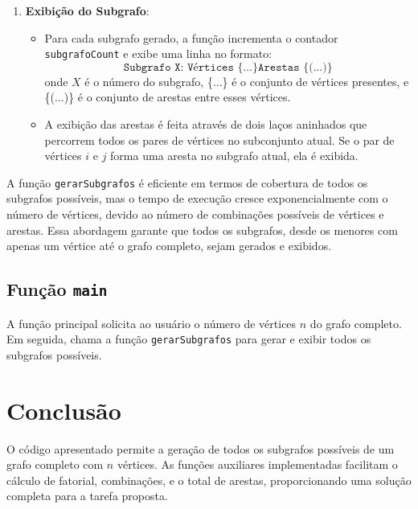 \documentclass{article}
\begin{document}
\begin{enumerate}
    \item \textbf{Exibição do Subgrafo}:
    \begin{itemize}
        \item Para cada subgrafo gerado, a função incrementa o contador \texttt{subgrafoCount} e exibe uma linha no formato: 
        \[
        \texttt{Subgrafo X: Vértices \{...\} Arestas \{(...)\}}
        \]
        onde \(X\) é o número do subgrafo, \{...\} é o conjunto de vértices presentes, e \{(...)\} é o conjunto de arestas entre esses vértices.
        \item A exibição das arestas é feita através de dois laços aninhados que percorrem todos os pares de vértices no subconjunto atual. Se o par de vértices \(i\) e \(j\) forma uma aresta no subgrafo atual, ela é exibida.
    \end{itemize}
\end{enumerate}

A função \texttt{gerarSubgrafos} é eficiente em termos de cobertura de todos os subgrafos possíveis, mas o tempo de execução cresce exponencialmente com o número de vértices, devido ao número de combinações possíveis de vértices e arestas. Essa abordagem garante que todos os subgrafos, desde os menores com apenas um vértice até o grafo completo, sejam gerados e exibidos.

\subsection{Função \texttt{main}}
A função principal solicita ao usuário o número de vértices \(n\) do grafo completo. Em seguida, chama a função \texttt{gerarSubgrafos} para gerar e exibir todos os subgrafos possíveis.

\section{Conclusão}
O código apresentado permite a geração de todos os subgrafos possíveis de um grafo completo com \(n\) vértices. As funções auxiliares implementadas facilitam o cálculo de fatorial, combinações, e o total de arestas, proporcionando uma solução completa para a tarefa proposta.
\end{document}
